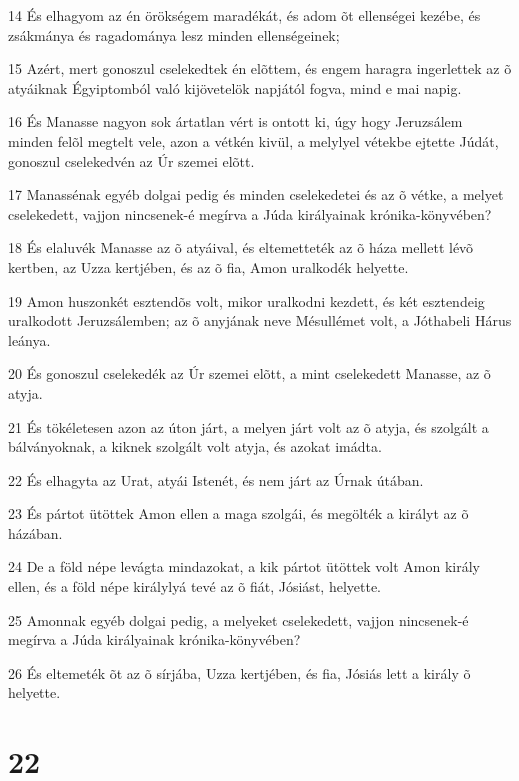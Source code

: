 \par 14 És elhagyom az én örökségem maradékát, és adom õt ellenségei kezébe, és zsákmánya és ragadománya lesz minden ellenségeinek;
\par 15 Azért, mert gonoszul cselekedtek én elõttem, és engem haragra ingerlettek az õ atyáiknak Égyiptomból való kijövetelök napjától fogva, mind e mai napig.
\par 16 És Manasse nagyon sok ártatlan vért is ontott ki, úgy hogy Jeruzsálem minden felõl megtelt vele, azon a vétkén  kivül, a melylyel vétekbe ejtette Júdát, gonoszul cselekedvén az Úr szemei elõtt.
\par 17 Manassénak egyéb dolgai pedig és minden cselekedetei és az õ vétke, a melyet cselekedett, vajjon nincsenek-é megírva a Júda királyainak krónika-könyvében?
\par 18 És elaluvék Manasse az õ atyáival, és eltemetteték az õ háza mellett lévõ kertben, az Uzza kertjében, és az õ fia, Amon uralkodék helyette.
\par 19 Amon huszonkét esztendõs volt, mikor uralkodni kezdett, és két esztendeig uralkodott Jeruzsálemben; az õ anyjának neve Mésullémet volt, a Jóthabeli Hárus leánya.
\par 20 És gonoszul cselekedék az Úr szemei elõtt, a mint cselekedett Manasse, az õ atyja.
\par 21 És tökéletesen azon az úton járt, a melyen járt volt az õ atyja, és szolgált a bálványoknak, a kiknek szolgált volt atyja, és azokat imádta.
\par 22 És elhagyta az Urat, atyái Istenét, és nem járt az Úrnak útában.
\par 23 És pártot ütöttek Amon ellen a maga szolgái, és megölték a királyt az õ házában.
\par 24 De a föld népe levágta mindazokat, a kik pártot ütöttek volt Amon király ellen, és a föld népe királylyá tevé az õ fiát, Jósiást, helyette.
\par 25 Amonnak egyéb dolgai pedig, a melyeket cselekedett, vajjon nincsenek-é megírva a Júda királyainak krónika-könyvében?
\par 26 És eltemeték õt az õ sírjába, Uzza kertjében, és fia, Jósiás lett a király õ helyette.

\chapter{22}

